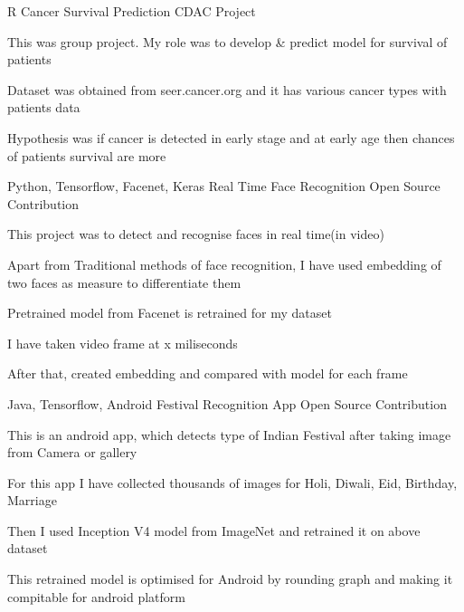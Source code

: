 \begin{cventries}
  \cventry
    {R} %
    {Cancer Survival Prediction} %
    {CDAC Project} %
    {} %
    {
      \begin{cvitems} %
        \item {This was group project. My role was  to develop \& predict model for survival of patients}
        \item {Dataset was obtained from seer.cancer.org and it has various cancer types with patients data}
        \item {Hypothesis was if cancer is detected in early stage and at early age 
               then chances of patients survival are more}
      \end{cvitems}
    }

  \cventry
    {Python, Tensorflow, Facenet, Keras} %
    {Real Time Face Recognition} %
    {Open Source Contribution} %
    {} %
    {
      \begin{cvitems} %
        \item {This project was to detect and recognise faces in real time(in video)}
        \item {Apart from Traditional methods of face recognition, I have used embedding of two faces as measure to differentiate them}
        \item {Pretrained model from Facenet is retrained for my dataset}
        \item {I have taken video frame at x miliseconds}
        \item {After that, created embedding and compared with model for each frame}
      \end{cvitems}
    }

  \cventry
    {Java, Tensorflow, Android} %
    {Festival Recognition App} %
    {Open Source Contribution} %
    {} %
    {
      \begin{cvitems} %
        \item {This is an android app, which detects type of Indian Festival after taking image from Camera or gallery}
        \item {For this app I have collected thousands of images for Holi, Diwali, Eid, Birthday, Marriage}
        \item {Then I used Inception V4 model from ImageNet and retrained it on above dataset}
        \item {This retrained model is optimised for Android by rounding graph and making it compitable for android platform}
      \end{cvitems}
    }


\end{cventries}
